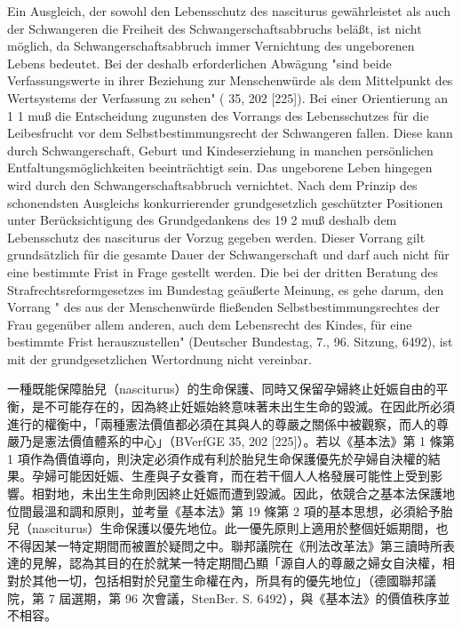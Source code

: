 \documentclass[12pt]{article}
\begin{document}
\syncleft
\begin{sourcepara}
Ein Ausgleich, der sowohl den Lebensschutz des nasciturus gewährleistet als auch der Schwangeren die Freiheit des Schwangerschaftsabbruchs beläßt, ist nicht möglich, da Schwangerschaftsabbruch immer Vernichtung des ungeborenen Lebens bedeutet. Bei der deshalb erforderlichen Abwägung "sind beide Verfassungswerte in ihrer Beziehung zur Menschenwürde als dem Mittelpunkt des Wertsystems der Verfassung zu sehen" (\abbrBVerfGE{} 35, 202 [225]). Bei einer Orientierung an \abbrArt{} 1 \abbrAbs{} 1 \abbrGG{} muß die Entscheidung zugunsten des Vorrangs des Lebensschutzes für die Leibesfrucht vor dem Selbstbestimmungsrecht der Schwangeren fallen. Diese kann durch Schwangerschaft, Geburt und Kindeserziehung in manchen persönlichen Entfaltungsmöglichkeiten beeinträchtigt sein. Das ungeborene Leben hingegen wird durch den Schwangerschaftsabbruch vernichtet. Nach dem Prinzip des schonendsten Ausgleichs konkurrierender grundgesetzlich geschützter Positionen unter Berücksichtigung des Grundgedankens des \abbrArt{} 19 \abbrAbs{} 2 \abbrGG{} muß deshalb dem Lebensschutz des nasciturus der Vorzug gegeben werden. Dieser Vorrang gilt grundsätzlich für die gesamte Dauer der Schwangerschaft und darf auch nicht für eine bestimmte Frist in Frage gestellt werden. Die bei der dritten Beratung des Strafrechtsreformgesetzes im Bundestag geäußerte Meinung, es gehe darum, den Vorrang " des aus der Menschenwürde fließenden Selbstbestimmungsrechtes der Frau gegenüber allem anderen, auch dem Lebensrecht des Kindes, für eine bestimmte Frist herauszustellen" (Deutscher Bundestag, 7.\abbrWp{}, 96. Sitzung, \abbrStenBer{} \abbrS{} 6492), ist mit der grundgesetzlichen Wertordnung nicht vereinbar.
\end{sourcepara}
\begin{transpara}
一種既能保障胎兒（nasciturus）的生命保護、同時又保留孕婦終止妊娠自由的平衡，是不可能存在的，因為終止妊娠始終意味著未出生生命的毀滅。在因此所必須進行的權衡中，「兩種憲法價值都必須在其與人的尊嚴之關係中被觀察，而人的尊嚴乃是憲法價值體系的中心」（BVerfGE 35, 202 [225]）。若以《基本法》第 1 條第 1 項作為價值導向，則決定必須作成有利於胎兒生命保護優先於孕婦自決權的結果。孕婦可能因妊娠、生產與子女養育，而在若干個人人格發展可能性上受到影響。相對地，未出生生命則因終止妊娠而遭到毀滅。因此，依競合之基本法保護地位間最溫和調和原則，並考量《基本法》第 19 條第 2 項的基本思想，必須給予胎兒（nasciturus）生命保護以優先地位。此一優先原則上適用於整個妊娠期間，也不得因某一特定期間而被置於疑問之中。聯邦議院在《刑法改革法》第三讀時所表達的見解，認為其目的在於就某一特定期間凸顯「源自人的尊嚴之婦女自決權，相對於其他一切，包括相對於兒童生命權在內，所具有的優先地位」（德國聯邦議院，第 7 屆選期，第 96 次會議，StenBer. S. 6492），與《基本法》的價值秩序並不相容。
\end{transpara}
\end{document}
